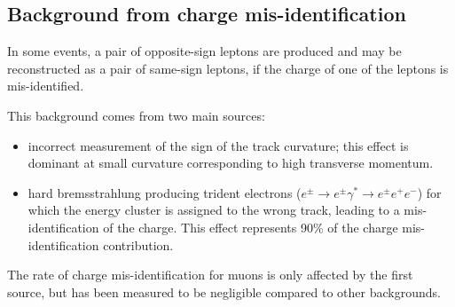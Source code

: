 \subsection{Background from charge mis-identification}\label{sect:misid}
In some events, a pair of opposite-sign leptons are produced and may be reconstructed as a
pair of same-sign leptons, if the charge of one of the leptons is mis-identified.

This background comes from two main sources: 
\begin{itemize}
\item
incorrect measurement of the sign of the track curvature; this effect is dominant at small curvature corresponding to high transverse momentum.
\item 
hard bremsstrahlung producing trident electrons 
($e^{\pm} \rightarrow e^{\pm}\gamma^{*} \rightarrow e^{\pm}e^{+}e^{-}$) for which the energy 
cluster is assigned to the wrong track, leading to a mis-identification of the charge. This
effect represents 90\% of the charge mis-identification contribution.
\end{itemize}
The rate of charge mis-identification for muons is only affected by
the first source, but has been measured to be negligible compared to
other backgrounds.

